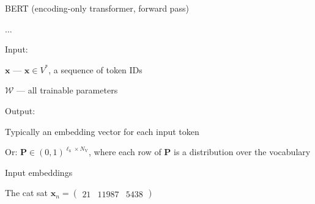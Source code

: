 \documentclass[12pt,aspectratio=169,handout]{beamer}
\begin{document}
\begin{frame}{BERT (encoding-only transformer, forward pass)}
	
	\begin{minipage}[t][3em][t]{15cm}
		\begin{algorithmic}[1]
			\State $\ldots$
			\EndFunction
		\end{algorithmic}
		
	\end{minipage}
	
Input:

$\bm{x}$ --- $\bm{x} \in V^*$, a sequence of token IDs

$\bm{\mathcal{W}}$ --- all trainable parameters

Output:

Typically an embedding vector for each input token

Or: $\bm{P} \in (0,1)^{\ell_{\text{x}} \times N_{\text{V}}}$, where each row of $\bm{P}$ is a distribution over the vocabulary

\end{frame}




\begin{frame}{Input embeddings}
	
	The cat sat $\bm{x}_n =
	\begin{pmatrix}
		21 &
		11987 &
		5438
	\end{pmatrix}$
	
\end{frame}	
\end{document}
